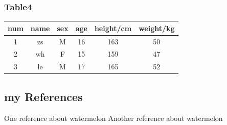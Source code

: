 \documentclass[11pt,a4paper,twocolumn]{article}
\begin{document}
\subsubsection{Table4}
\begin{tabular}{cccccc}
  \toprule
  num & name & sex & age & height/cm & weight/kg \\
  \midrule
  1 & zs & M & 16 & 163 & 50 \\
  2 & wh & F & 15 & 159 & 47 \\
  3 & le & M & 17 & 165 & 52 \\
  \bottomrule
\end{tabular}


\subsection{my References}
One reference about watermelon \cite{gostout1992clinical}       
Another reference about watermelon \cite{rivero2001resistance}       

       


\end{document}
